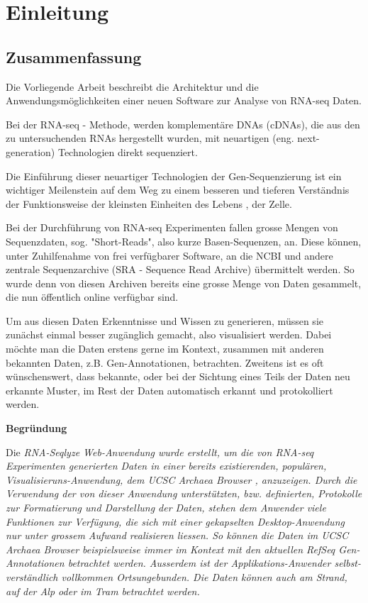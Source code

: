 \documentclass[a4paper]{thesis}
\begin{document}

\renewcommand\contentsname{Inhalt}
\tableofcontents
\listoftodos
\newpage

\section{Einleitung}

\subsection{Zusammenfassung}

Die Vorliegende Arbeit beschreibt die Architektur und die
Anwendungs\-möglichkeiten einer neuen Software zur Analyse von RNA-seq Daten.

Bei der RNA-seq - Methode, werden komplementäre DNAs (cDNAs), die aus den zu
untersuchenden RNAs hergestellt wurden, mit neuartigen (eng. next-generation)
Technologien direkt sequenziert. \cite{ausubel_rna-seq:_2010}

Die Einführung dieser neuartiger Technologien der Gen-Sequenzierung
ist ein wichtiger Meilenstein auf dem Weg zu einem besseren und
tieferen Verständnis der Funktionsweise der kleinsten Einheiten
des Lebens , der Zelle.

Bei der Durchführung von RNA-seq Experimenten fallen grosse Mengen von
Sequenzdaten, sog. "Short-Reads", also kurze Basen-Sequenzen, an. Diese
können, unter Zuhilfenahme von frei verfügbarer Software, an die NCBI
und andere zentrale Sequenzarchive (SRA - Sequence Read Archive) übermittelt
werden. So wurde denn von diesen Archiven bereits eine grosse Menge von
Daten gesammelt, die nun öffentlich online verfügbar sind.

Um aus diesen Daten Erkenntnisse und Wissen zu generieren, müssen sie
zunächst einmal besser zugänglich gemacht, also visualisiert werden.
Dabei möchte man die Daten erstens gerne im Kontext, zusammen mit anderen
bekannten Daten, z.B. Gen-Annotationen, betrachten. Zweitens ist es oft
wünschenswert, dass bekannte, oder bei der Sichtung eines Teils der Daten
neu erkannte Muster, im Rest der Daten automatisch erkannt und protokolliert
werden.

\textbf{Begründung}

Die \em{RNA-Seqlyze} Web-Anwendung wurde erstellt, um die von RNA-seq
Experimenten generierten Daten in einer bereits existierenden, populären,
Visuali\-sier\-uns-Anwendung, dem \em{UCSC Archaea Browser}
\cite{schneider_ucsc_2006}, anzuzeigen. Durch die Verwendung der von dieser
Anwendung unterstützten, bzw. definierten, Protokolle zur Formatierung
und Darstellung der Daten, stehen dem Anwender viele Funktionen zur
Verfügung, die sich mit einer gekapselten Desktop-Anwendung nur unter
grossem Aufwand realisieren liessen. So können die Daten im \em{UCSC Archaea
Browser} beispielsweise immer im Kontext mit den \em{aktuellen} RefSeq
Gen-Annotationen betrachtet werden. Ausserdem ist der Applikations-Anwender
selbst-verständlich vollkommen Ortsungebunden. Die Daten können auch am
Strand, auf der Alp oder im Tram betrachtet werden. 
\end{document}
